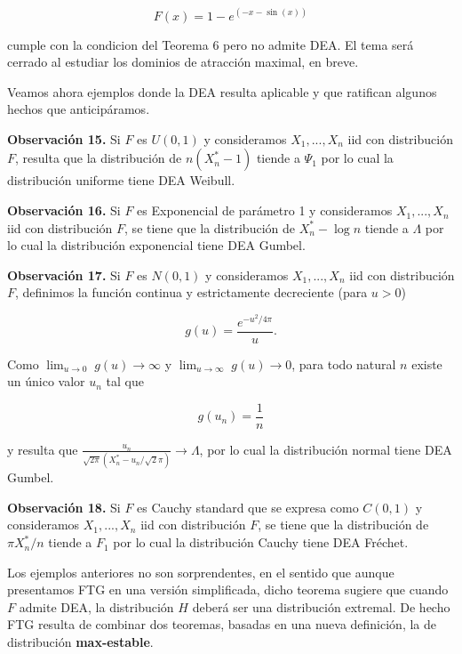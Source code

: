 \documentclass[
  20pt,
]{book}
\theoremstyle{definition}
\theoremstyle{definition}
\theoremstyle{definition}
\theoremstyle{definition}
\theoremstyle{remark}
\begin{document}
\begin{equation}
F(x)= 1- e^{(-x-\sin(x))}
\end{equation}

cumple con la condicion del Teorema 6 pero no
admite DEA. El tema será cerrado al estudiar los
dominios de atracción maximal, en breve.

Veamos ahora ejemplos donde la DEA resulta
aplicable y que ratifican algunos hechos que
anticipáramos.

\textbf{Observación 15.} Si \(F\) es \(U(0,1)\) y consideramos
\(X_1,...,X_n\) iid con distribución \(F\), resulta que
la distribución de \(n( X_n^{\ast} - 1)\) tiende a \(\Psi_1\) por lo cual la distribución uniforme tiene DEA
Weibull.

\textbf{Observación 16.} Si \(F\) es Exponencial de
parámetro 1 y consideramos \(X_1,...,X_n\) iid con
distribución \(F\), se tiene que la distribución de \(X_n^{\ast} - \log n\) tiende a \(\Lambda\) por lo cual la distribución exponencial tiene DEA Gumbel.

\textbf{Observación 17.} Si \(F\) es \(N(0,1)\) y consideramos
\(X_1,...,X_n\) iid con distribución \(F\), definimos la función continua y estrictamente decreciente (para \(u>0\))

\begin{equation}
g(u)= \frac{e^{-u^2/4\pi}}{u}.
\end{equation}

Como \(\lim_{u \to 0}\; g(u) \rightarrow \infty\) y \(\lim_{u \to \infty}\; g(u) \rightarrow 0\),
para todo natural \(n\) existe un único valor \(u_n\) tal que

\begin{equation}
g(u_n)=\frac{1}{n}
\end{equation}

y resulta que \(\frac{u_n}{\sqrt{2\pi} (X_n^{\ast}- u_n /\sqrt 2\pi)} \rightarrow \Lambda\), por lo cual la distribución normal tiene DEA Gumbel.

\textbf{Observación 18.} Si \(F\) es Cauchy standard que se expresa como \(C(0,1)\)
y consideramos \(X_1,...,X_n\) iid con distribución \(F\), se tiene que
la distribución de \(\pi X_n^{\ast}/n\) tiende a \(F_1\) por lo cual la distribución Cauchy tiene DEA Fréchet.

Los ejemplos anteriores no son sorprendentes, en el sentido
que aunque presentamos FTG en una versión simplificada,
dicho teorema sugiere que cuando \(F\) admite DEA, la
distribución \(H\) deberá ser una distribución extremal. De hecho
FTG resulta de combinar dos teoremas, basadas en una nueva
definición, la de distribución \textbf{max-estable}.
\end{document}
